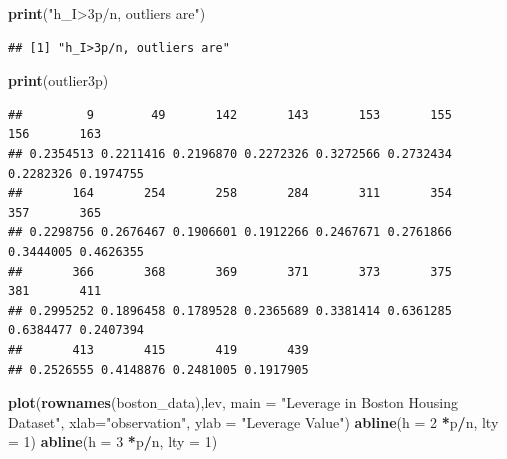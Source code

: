 \documentclass[
]{article}
\newenvironment{Shaded}{\begin{snugshade}}{\end{snugshade}}
\newcommand{\AttributeTok}[1]{\textcolor[rgb]{0.13,0.29,0.53}{#1}}
\newcommand{\DecValTok}[1]{\textcolor[rgb]{0.00,0.00,0.81}{#1}}
\newcommand{\FunctionTok}[1]{\textcolor[rgb]{0.13,0.29,0.53}{\textbf{#1}}}
\newcommand{\NormalTok}[1]{#1}
\newcommand{\SpecialCharTok}[1]{\textcolor[rgb]{0.81,0.36,0.00}{\textbf{#1}}}
\newcommand{\StringTok}[1]{\textcolor[rgb]{0.31,0.60,0.02}{#1}}
\begin{document}
\begin{Shaded}
\begin{Highlighting}[]
\FunctionTok{print}\NormalTok{(}\StringTok{"h\_I\textgreater{}3p/n, outliers are"}\NormalTok{)}
\end{Highlighting}
\end{Shaded}

\begin{verbatim}
## [1] "h_I>3p/n, outliers are"
\end{verbatim}

\begin{Shaded}
\begin{Highlighting}[]
\FunctionTok{print}\NormalTok{(outlier3p)}
\end{Highlighting}
\end{Shaded}

\begin{verbatim}
##         9        49       142       143       153       155       156       163 
## 0.2354513 0.2211416 0.2196870 0.2272326 0.3272566 0.2732434 0.2282326 0.1974755 
##       164       254       258       284       311       354       357       365 
## 0.2298756 0.2676467 0.1906601 0.1912266 0.2467671 0.2761866 0.3444005 0.4626355 
##       366       368       369       371       373       375       381       411 
## 0.2995252 0.1896458 0.1789528 0.2365689 0.3381414 0.6361285 0.6384477 0.2407394 
##       413       415       419       439 
## 0.2526555 0.4148876 0.2481005 0.1917905
\end{verbatim}

\begin{Shaded}
\begin{Highlighting}[]
\FunctionTok{plot}\NormalTok{(}\FunctionTok{rownames}\NormalTok{(boston\_data),lev, }\AttributeTok{main =} \StringTok{"Leverage in Boston Housing Dataset"}\NormalTok{, }\AttributeTok{xlab=}\StringTok{"observation"}\NormalTok{, }\AttributeTok{ylab =} \StringTok{"Leverage Value"}\NormalTok{)}
\FunctionTok{abline}\NormalTok{(}\AttributeTok{h =} \DecValTok{2} \SpecialCharTok{*}\NormalTok{p}\SpecialCharTok{/}\NormalTok{n, }\AttributeTok{lty =} \DecValTok{1}\NormalTok{)}
\FunctionTok{abline}\NormalTok{(}\AttributeTok{h =} \DecValTok{3} \SpecialCharTok{*}\NormalTok{p}\SpecialCharTok{/}\NormalTok{n, }\AttributeTok{lty =} \DecValTok{1}\NormalTok{)}
\end{Highlighting}
\end{Shaded}
\end{document}
